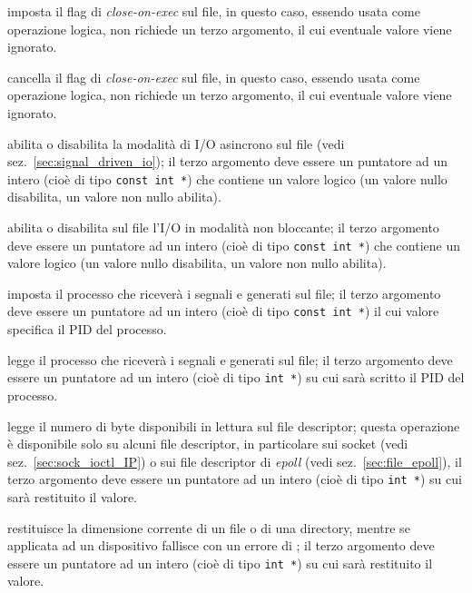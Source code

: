\begin{basedescript}{\desclabelwidth{2.0cm}}
\item[\constd{FIOCLEX}] imposta il flag di \textit{close-on-exec} sul file, in
  questo caso, essendo usata come operazione logica,  non richiede
  un terzo argomento, il cui eventuale valore viene ignorato.
\item[\constd{FIONCLEX}] cancella il flag di \textit{close-on-exec} sul file,
  in questo caso, essendo usata come operazione logica,  non
  richiede un terzo argomento, il cui eventuale valore viene ignorato.
\item[\constd{FIOASYNC}] abilita o disabilita la modalità di I/O asincrono sul
  file (vedi sez.~\ref{sec:signal_driven_io}); il terzo argomento
  deve essere un puntatore ad un intero (cioè di tipo \texttt{const int *})
  che contiene un valore logico (un valore nullo disabilita, un valore non
  nullo abilita).
\item[\constd{FIONBIO}] abilita o disabilita sul file l'I/O in modalità non
  bloccante; il terzo argomento deve essere un puntatore ad un intero (cioè di
  tipo \texttt{const int *}) che contiene un valore logico (un valore nullo
  disabilita, un valore non nullo abilita).
\item[\constd{FIOSETOWN}] imposta il processo che riceverà i segnali
   e  generati sul file; il terzo argomento deve
  essere un puntatore ad un intero (cioè di tipo \texttt{const int *}) il cui
  valore specifica il PID del processo.
\item[\constd{FIOGETOWN}] legge il processo che riceverà i segnali
   e  generati sul file; il terzo argomento deve
  essere un puntatore ad un intero (cioè di tipo \texttt{int *}) su cui sarà
  scritto il PID del processo.
\item[\constd{FIONREAD}] legge il numero di byte disponibili in lettura sul
  file descriptor; questa operazione è disponibile solo su alcuni file
  descriptor, in particolare sui socket (vedi sez.~\ref{sec:sock_ioctl_IP}) o
  sui file descriptor di \textit{epoll} (vedi sez.~\ref{sec:file_epoll}), il
  terzo argomento deve essere un puntatore ad un intero (cioè di tipo
  \texttt{int *}) su cui sarà restituito il valore.
\item[\constd{FIOQSIZE}] restituisce la dimensione corrente di un file o di una
  directory, mentre se applicata ad un dispositivo fallisce con un errore di
  ; il terzo argomento deve essere un puntatore ad un intero
  (cioè di tipo \texttt{int *}) su cui sarà restituito il valore.
\end{basedescript}

